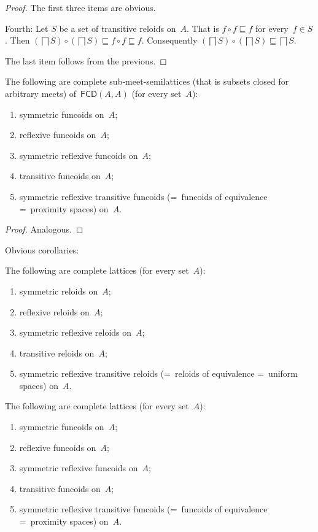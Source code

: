 \begin{proof}
The first three items are obvious.

Fourth: Let $S$ be a set of transitive reloids on~$A$. That is $f\circ f\sqsubseteq f$ for every~$f\in S$. Then $(\bigsqcap S)\circ(\bigsqcap S)\sqsubseteq f\circ f\sqsubseteq f$.
Consequently $(\bigsqcap S)\circ(\bigsqcap S)\sqsubseteq \bigsqcap S$.

The last item follows from the previous.
\end{proof}


\begin{prop}
The following are complete sub-meet-semilattices (that is subsets closed for arbitrary meets) of~$\mathsf{FCD}(A,A)$ (for every set~$A$):
\begin{enumerate}
\item symmetric funcoids on~$A$;
\item reflexive funcoids on~$A$;
\item symmetric reflexive funcoids on~$A$;
\item transitive funcoids on~$A$;
\item symmetric reflexive transitive funcoids (=~funcoids of equivalence =~proximity spaces) on~$A$.
\end{enumerate}
\end{prop}

\begin{proof}
Analogous.
\end{proof}

Obvious corollaries:

\begin{cor}
The following are complete lattices (for every set~$A$):
\begin{enumerate}
\item symmetric reloids on~$A$;
\item reflexive reloids on~$A$;
\item symmetric reflexive reloids on~$A$;
\item transitive reloids on~$A$;
\item symmetric reflexive transitive reloids (=~reloids of equivalence =~uniform spaces) on~$A$.
\end{enumerate}
\end{cor}

\begin{cor}
The following are complete lattices (for every set~$A$):
\begin{enumerate}
\item symmetric funcoids on~$A$;
\item reflexive funcoids on~$A$;
\item symmetric reflexive funcoids on~$A$;
\item transitive funcoids on~$A$;
\item symmetric reflexive transitive funcoids (=~funcoids of equivalence =~proximity spaces) on~$A$.
\end{enumerate}
\end{cor}

